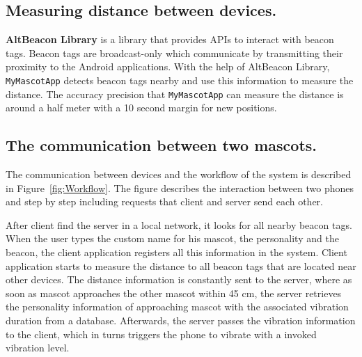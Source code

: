 \subsection{Measuring distance between devices.}
\label{subsec:measuring-distance-between-devices.}
\textbf{AltBeacon Library} is a library that provides APIs to interact with beacon tags.
Beacon tags are broadcast-only which communicate by transmitting their proximity to the Android applications.
With the help of AltBeacon Library, \texttt{MyMascotApp} detects beacon tags nearby
and use this information to measure the distance.
The accuracy precision that \texttt{MyMascotApp} can measure the distance is around a half meter
with a 10 second margin for new positions.

\subsection{The communication between two mascots.}
\label{subsec:the-communication-between-two-mascots.}
The communication between devices and the workflow of the system is described in Figure~\ref{fig:Workflow}.
The figure describes the interaction between two phones and step by step including requests that client and server send each other.

After client find the server in a local network, it looks for all nearby beacon tags.
When the user types the custom name for his mascot, the personality and the beacon, the client
application registers all this information in the system.
Client application starts to measure the distance to all beacon tags that are located near other devices.
The distance information is constantly sent to the server, where as soon as mascot approaches the other mascot within
45 cm, the server retrieves the personality information of approaching mascot with the associated vibration duration
from a database.
Afterwards, the server passes the vibration information to the client, which in turns triggers the
phone to vibrate with a invoked vibration level.

